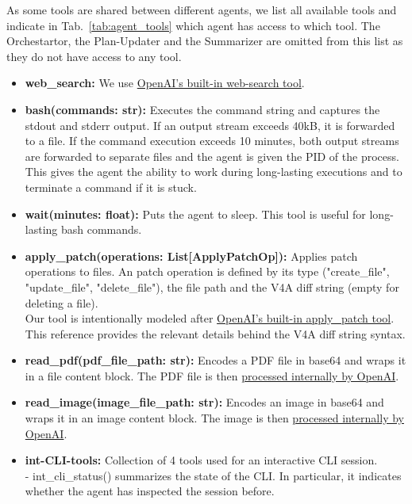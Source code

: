 \documentclass[submission, Phys]{SciPost}
\begin{document}

As some tools are shared between different agents, we list all available tools and indicate in Tab.~\ref{tab:agent_tools} which agent has access to which tool. The Orchestartor, the Plan-Updater and the Summarizer are omitted from this list as they do not have access to any tool.
\begin{itemize}
    \item \textbf{web\_search:} We use \href{https://platform.openai.com/docs/guides/tools-web-search}{OpenAI's built-in web-search tool}.
    \item \textbf{bash(commands: str):} Executes the command string and captures the stdout and stderr output. If an output stream exceeds 40kB, it is forwarded to a file. If the command execution exceeds 10 minutes, both output streams are forwarded to separate files and the agent is given the PID of the process. This gives the agent the ability to work during long-lasting executions and to terminate a command if it is stuck.
    \item \textbf{wait(minutes: float):} Puts the agent to sleep. This tool is useful for long-lasting bash commands.
    \item \textbf{apply\_patch(operations: List[ApplyPatchOp]):} Applies patch operations to files. An patch operation is defined by its type ("create\_file", "update\_file", "delete\_file"), the file path and the V4A diff string (empty for deleting a file).\\
    Our tool is intentionally modeled after \href{https://platform.openai.com/docs/guides/tools-apply-patch}{OpenAI's built-in apply\_patch tool}. This reference provides the relevant details behind the V4A diff string syntax.
    \item \textbf{read\_pdf(pdf\_file\_path: str):} Encodes a PDF file in base64 and wraps it in a file content block. The PDF file is then \href{https://platform.openai.com/docs/guides/pdf-files}{processed internally by OpenAI}.
    \item \textbf{read\_image(image\_file\_path: str):} Encodes an image in base64 and wraps it in an image content block. The image is then \href{https://platform.openai.com/docs/guides/images-vision}{processed internally by OpenAI}.
    \item \textbf{int-CLI-tools:} Collection of 4 tools used for an interactive CLI session.\\
    - int\_cli\_status() summarizes the state of the CLI. In particular, it indicates whether the agent has inspected the session before.\\

\end{itemize}
\end{document}
